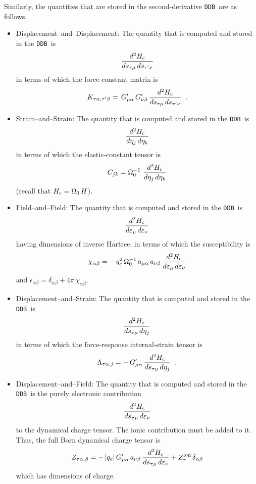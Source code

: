 \documentclass[11pt,fleqn]{article}
\def\beq{\begin{equation}}
\def\eeq{\end{equation}}
\def\eps{\epsilon}
\def\Oo{\Omega_0}
\def\bc{_{\rm c}}
\def\veps{\varepsilon}
\def\DDB{{\tt DDB}}
\begin{document}
Similarly, the quantities that are stored in the second-derivative
\DDB\ are as follows.
%
\begin{itemize}

\item Displacement--and--Displacement:
%
The quantity that is computed and stored in the \DDB\ is
%
\beq
{d^2H\bc\over ds_{\tau\mu}\,ds_{\tau'\nu}}
\eeq
%
in terms of which the force-constant matrix is
%
\beq
K_{\tau\alpha,\tau'\beta}=\,G'_{\mu\alpha}\,G'_{\nu\beta}\,
{d^2H\bc \over ds_{\tau\mu}\,ds_{\tau'\nu}}
\;\;.
\eeq
%

\item Strain--and--Strain:
%
The quantity that is computed and stored in the \DDB\ is
%
\beq
{d^2 H\bc \over d\eta_j\,d\eta_k}
\eeq
%
in terms of which the elastic-constant tensor is
%
\beq
C_{jk}= \Oo^{-1}\,\,{d^2 H\bc \over d\eta_j\,d\eta_k}
\eeq
%
(recall that $H\bc=\Oo\,H$).

\item Field--and--Field:
%
The quantity that is computed and stored in the \DDB\ is
%
\beq
{d^2H\bc \over d\veps_\mu\,d\veps_\nu}
\eeq
%
having dimensions of inverse Hartree,
in terms of which the susceptibility is
%
\beq
\chi_{\alpha\beta}=-\,q_e^2\, \Oo^{-1}\, a_{\mu\alpha}\,a_{\nu\beta}\,
   {d^2H\bc \over d\veps_\mu\,d\veps_\nu}
\eeq
%
and $\eps_{\alpha\beta}=\delta_{\alpha\beta}+4\pi\,\chi_{\alpha\beta}$.


\item Displacement--and--Strain:
%
The quantity that is computed and stored in the \DDB\ is
%
\beq
{d^2H\bc \over ds_{\tau\mu}\,d\eta_j}
\eeq
%
in terms of which the force-response internal-strain tensor is
%
\beq
\Lambda_{\tau\alpha,j}= -\,G'_{\mu\alpha}\,
{d^2H\bc \over ds_{\tau\mu}\,d\eta_j}
\;\;.
\eeq
%

\item Displacement--and--Field:
%
The quantity that is computed and stored in the \DDB\ is
the purely electronic contribution
%
\beq
{d^2H\bc \over ds_{\tau\mu}\,d\veps_\nu}
\eeq
%
to the dynamical charge tensor.  The ionic contribution must be
added to it.  Thus, the full Born dynamical charge tensor is
%
\beq
Z_{\tau\alpha,\beta}=-\,|q_e|\,G'_{\mu\alpha}\,a_{\nu\beta}\,
{d^2H\bc \over ds_{\tau\mu}\,d\veps_\nu}
+ Z^{\rm ion}_\tau\,\delta_{\alpha\beta}
\eeq
%
which has dimensions of charge.


\end{itemize}
\end{document}

